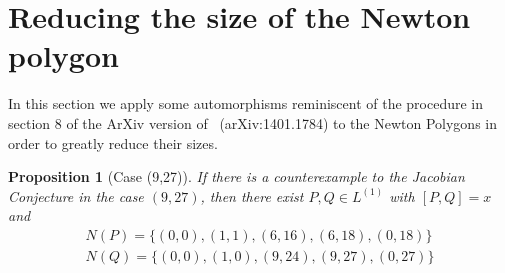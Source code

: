 \documentclass[reqno,a4paper,twoside]{amsart}
\newtheorem{proposition}[theorem]{Proposition}
\theoremstyle{definition}
\theoremstyle{remark}
\begin{document}
\section{Reducing the size of the Newton polygon}
\label{seccion 3}

In this section we apply some automorphisms reminiscent of the procedure in section 8 of the ArXiv version of~\cite{GGV1} (arXiv:1401.1784)
 to the Newton Polygons in order to greatly reduce their sizes.

\begin{proposition}[Case (9,27)]  \label{case927}
	If there is a counterexample to the Jacobian Conjecture in the case $(9,27)$, then there exist $P,Q \in L^{(1)}$ with $[P,Q] = x$ and
	\begin{align*}
	N(P) = \{(0,0),(1,1),(6,16), (6,18), (0,18)\} \\
	N(Q) = \{(0,0),(1,0),(9,24), (9,27), (0,27)\}
	\end{align*}
\end{proposition}
\end{document}
